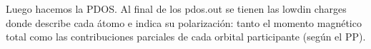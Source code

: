 \begin{figure}[H]
  \end{figure}

  Luego hacemos la PDOS. Al final de los pdos.out se tienen las lowdin charges donde describe cada átomo e indica su polarización: tanto el momento magnético total como las contribuciones parciales de cada orbital participante (según el PP).

